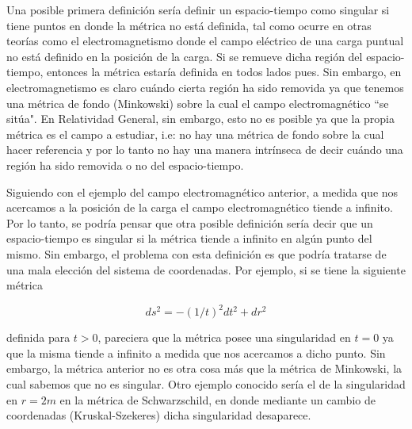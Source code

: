 Una posible primera definición sería definir un espacio-tiempo como singular si tiene puntos en donde la métrica no está definida, tal como ocurre en otras teorías como el electromagnetismo donde el campo eléctrico de una carga puntual no está definido en la posición de la carga. Si se remueve dicha región del espacio-tiempo, entonces la métrica estaría definida en todos lados pues. 
Sin embargo, en electromagnetismo es claro cuándo cierta región ha sido removida ya que tenemos una métrica de fondo (Minkowski) sobre la cual el campo electromagnético ``se sitúa". En Relatividad General, sin embargo, esto no es posible ya que la propia métrica es el campo a estudiar, i.e: no hay una métrica de fondo sobre la cual hacer referencia y por lo tanto no hay una manera intrínseca de decir cuándo una región ha sido removida o no del espacio-tiempo.

Siguiendo con el ejemplo del campo electromagnético anterior, a medida que nos acercamos a la posición de la carga el campo electromagnético tiende a infinito. Por lo tanto, se podría pensar que otra posible definición sería decir que un espacio-tiempo es singular si la métrica tiende a infinito en algún punto del mismo. Sin embargo, el problema con esta definición es que podría tratarse de una mala elección del sistema de coordenadas. Por ejemplo, si se tiene la siguiente métrica

$$
ds^2=-(1/t)^2dt^2+dr^2
$$ 

definida para $t>0$, pareciera que la métrica posee una singularidad en $t=0$ ya que la misma tiende a infinito a medida que nos acercamos a dicho punto. Sin embargo, la métrica anterior no es otra cosa más que la métrica de Minkowski, la cual sabemos que no es singular. Otro ejemplo conocido sería el de la singularidad en $r=2m$ en la métrica de Schwarzschild, en donde mediante un cambio de coordenadas (Kruskal-Szekeres) dicha singularidad desaparece.

